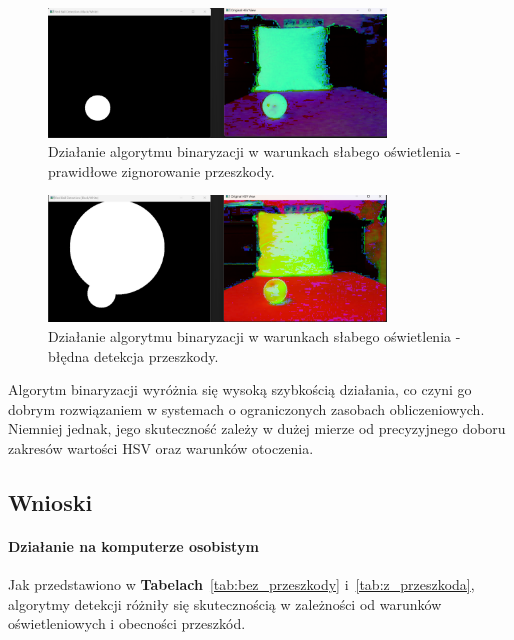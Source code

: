 \documentclass[a4paper,twoside,12pt]{book}
\begin{document}
\begin{figure}[h]
    \centering
    \includegraphics[width=0.8\textwidth]{Images/Porownanie/Binaryzacja/Zrzut ekranu 2025-01-02 193840.png}
    \caption{Działanie algorytmu binaryzacji w warunkach słabego oświetlenia - prawidłowe zignorowanie przeszkody.}
    \label{fig:binary_confusion_badlight_goodobject}
\end{figure}

\begin{figure}[h]
    \centering
    \includegraphics[width=0.8\textwidth]{Images/Porownanie/Binaryzacja/Zrzut ekranu 2025-01-02 193858.png}
    \caption{Działanie algorytmu binaryzacji w warunkach słabego oświetlenia - błędna detekcja przeszkody.}
    \label{fig:binary_confusion_goodlight_badobject}
\end{figure}

Algorytm binaryzacji wyróżnia się wysoką szybkością działania, co czyni go dobrym rozwiązaniem w systemach o ograniczonych zasobach obliczeniowych. Niemniej jednak, jego skuteczność zależy w dużej mierze od precyzyjnego doboru zakresów wartości HSV oraz warunków otoczenia.


\newpage
\subsection{Wnioski}

\paragraph{Działanie na komputerze osobistym}
Jak przedstawiono w \textbf{Tabelach}~\ref{tab:bez_przeszkody} i~\ref{tab:z_przeszkoda}, algorytmy detekcji różniły się skutecznością w zależności od warunków oświetleniowych i obecności przeszkód. 
\end{document}
